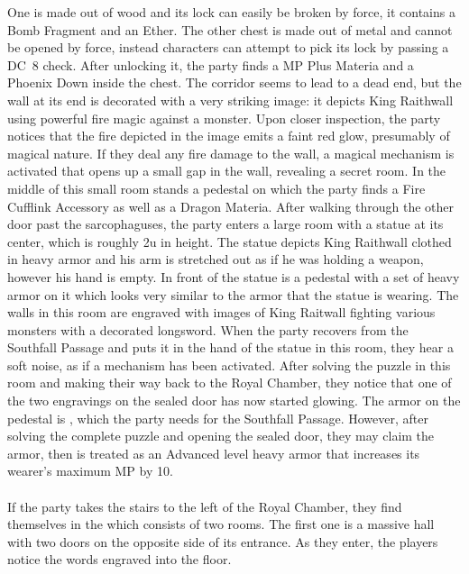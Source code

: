One is made out of wood and its lock can easily be broken by force, it contains a Bomb Fragment and an Ether.
The other chest is made out of metal and cannot be opened by force, instead characters can attempt to pick its lock by passing a DC~8 check.
After unlocking it, the party finds a MP Plus Materia and a Phoenix Down inside the chest.
The corridor seems to lead to a dead end, but the wall at its end is decorated with a very striking image: it depicts King Raithwall using powerful fire magic against a monster.
Upon closer inspection, the party notices that the fire depicted in the image emits a faint red glow, presumably of magical nature.
If they deal any fire damage to the wall, a magical mechanism is activated that opens up a small gap in the wall, revealing a secret room.
In the middle of this small room stands a pedestal on which the party finds a Fire Cufflink Accessory as well as a Dragon Materia.
%
\vfill
%
After walking through the other door past the sarcophaguses, the party enters a large room with a statue at its center, which is roughly 2u in height.
The statue depicts King Raithwall clothed in heavy armor and his arm is stretched out as if he was holding a weapon, however his hand is empty.
In front of the statue is a pedestal with a set of heavy armor on it which looks very similar to the armor that the statue is wearing.
The walls in this room are engraved with images of King Raitwall fighting various monsters with a decorated longsword.
When the party recovers  from the Southfall Passage and puts it in the hand of the statue in this room, they hear a soft noise, as if a mechanism has been activated.
After solving the puzzle in this room and making their way back to the Royal Chamber, they notice that one of the two engravings on the sealed door has now started glowing.
The armor on the pedestal is , which the party needs for the Southfall Passage.
However, after solving the complete puzzle and opening the sealed door, they may claim the armor, then is treated as an Advanced level heavy armor that increases its wearer's maximum MP by 10.
%
\newpage
%
\\\\
%
If the party takes the stairs to the left of the Royal Chamber, they find themselves in the  which consists of two rooms.
The first one is a massive hall with two doors on the opposite side of its entrance.
As they enter, the players notice the words  engraved into the floor.
